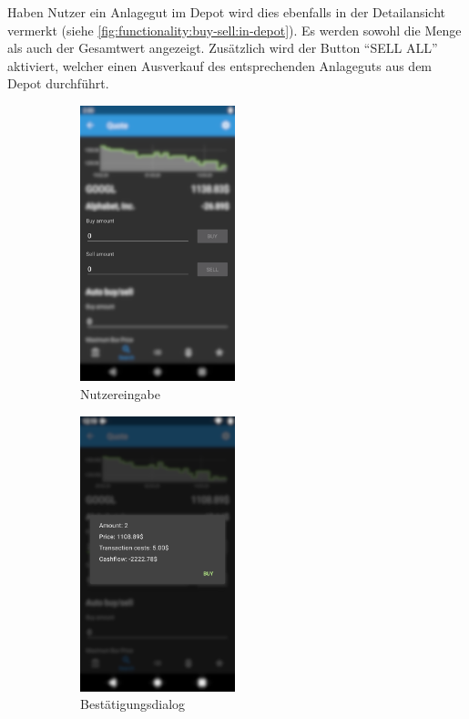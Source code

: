 \documentclass[a4paper]{article}
\begin{document}
Haben Nutzer ein Anlagegut im Depot wird dies ebenfalls in der Detailansicht vermerkt (siehe \autoref{fig:functionality:buy-sell:in-depot}).
Es werden sowohl die Menge als auch der Gesamtwert angezeigt.
Zusätzlich wird der Button "`SELL ALL"' aktiviert, welcher einen Ausverkauf des entsprechenden Anlageguts aus dem Depot durchführt.

\begin{figure}[H]
	\begin{subfigure}{.5\textwidth}
		\centering
		\includegraphics[height=8cm,keepaspectratio]{./images/quote/buy_sell.png}
		\caption{Nutzereingabe}
		\label{fig:functionality:buy-sell:input}
	\end{subfigure}
	\begin{subfigure}{.5\textwidth}
		\centering
		\includegraphics[height=8cm,keepaspectratio]{./images/quote/buy_dialog.png}
		\caption{Bestätigungsdialog}
		\label{fig:functionality:buy-sell:dialog}
	\end{subfigure}
	\begin{subfigure}{.5\textwidth}

\end{subfigure}
\end{figure}
\end{document}
